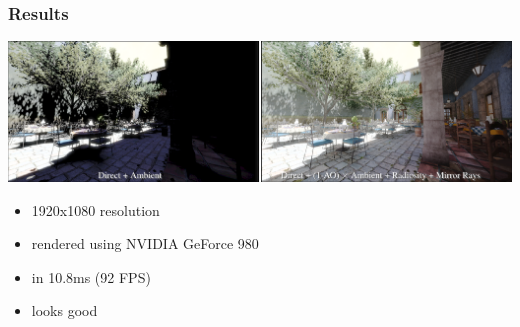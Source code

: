 \documentclass{beamer}
\begin{document}
	\begin{frame}
		\frametitle{Results}
		\includegraphics[width=\textwidth]{img/deep_g_buffer_render.png}
		\begin{itemize}
			\item 1920x1080 resolution
			\item rendered using NVIDIA GeForce 980
			\item in 10.8ms (92 FPS)
			\item looks good
		\end{itemize}
	\end{frame}
\end{document}
